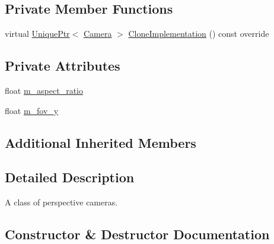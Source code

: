 \subsection*{Private Member Functions}
\begin{DoxyCompactItemize}
\item 
virtual \hyperlink{namespacemage_a3316d7143a973e37adf1110f2e80ca31}{Unique\+Ptr}$<$ \hyperlink{classmage_1_1_camera}{Camera} $>$ \hyperlink{classmage_1_1_perspective_camera_aa597ab884256b7e6fad63653af3ac789}{Clone\+Implementation} () const override
\end{DoxyCompactItemize}
\subsection*{Private Attributes}
\begin{DoxyCompactItemize}
\item 
float \hyperlink{classmage_1_1_perspective_camera_ab92d993fece777cfeca8d5c7d371ffc9}{m\+\_\+aspect\+\_\+ratio}
\item 
float \hyperlink{classmage_1_1_perspective_camera_abdcf1a0cdd247e0f7e14e70898678af6}{m\+\_\+fov\+\_\+y}
\end{DoxyCompactItemize}
\subsection*{Additional Inherited Members}


\subsection{Detailed Description}
A class of perspective cameras. 

\subsection{Constructor \& Destructor Documentation}
\hypertarget{classmage_1_1_perspective_camera_a5f832d99b65ea5b48cb0293f8c25a036}{}\label{classmage_1_1_perspective_camera_a5f832d99b65ea5b48cb0293f8c25a036} 
